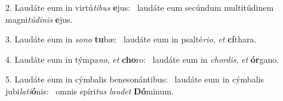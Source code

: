 2. Laudáte eum in virtú\textit{ti}\textit{bus} \textbf{e}jus: \ast\  laudáte eum secúndum multitúdinem magni\textit{tú}\textit{di}\textit{nis} \textbf{e}jus.\

3. Laudáte eum in \textit{so}\textit{no} \textbf{tu}bæ: \ast\  laudáte eum in psalté\textit{ri}\textit{o}, \textit{et} \textbf{cí}thara.\

4. Laudáte eum in týmpa\textit{no}, \textit{et} \textbf{cho}ro: \ast\  laudáte eum in \textit{chor}\textit{dis}, \textit{et} \textbf{ór}gano.\

5. Laudáte eum in cýmbalis benesonántibus: \dag\  laudáte eum in cýmbalis jubi\textit{la}\textit{ti}\textbf{ó}nis: \ast\  omnis spíri\textit{tus} \textit{lau}\textit{det} \textbf{Dó}minum.\

